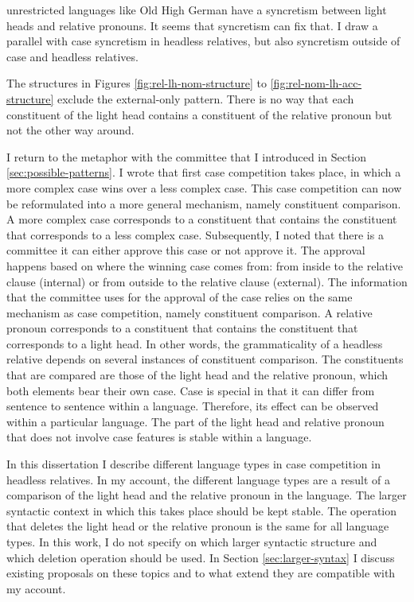 unrestricted languages like Old High German have a syncretism between light heads and relative pronouns. It seems that syncretism can fix that. I draw a parallel with case syncretism in headless relatives, but also syncretism outside of case and headless relatives.

The structures in Figures \ref{fig:rel-lh-nom-structure} to \ref{fig:rel-nom-lh-acc-structure} exclude the external-only pattern. There is no way that each constituent of the light head contains a constituent of the relative pronoun but not the other way around.

I return to the metaphor with the committee that I introduced in Section \ref{sec:possible-patterns}. I wrote that first case competition takes place, in which a more complex case wins over a less complex case. This case competition can now be reformulated into a more general mechanism, namely constituent comparison. A more complex case corresponds to a constituent that contains the constituent that corresponds to a less complex case.
Subsequently, I noted that there is a committee it can either approve this case or not approve it. The approval happens based on where the winning case comes from: from inside to the relative clause (internal) or from outside to the relative clause (external). The information that the committee uses for the approval of the case relies on the same mechanism as case competition, namely constituent comparison. A relative pronoun corresponds to a constituent that contains the constituent that corresponds to a light head.
In other words, the grammaticality of a headless relative depends on several instances of constituent comparison. The constituents that are compared are those of the light head and the relative pronoun, which both elements bear their own case. Case is special in that it can differ from sentence to sentence within a language. Therefore, its effect can be observed within a particular language. The part of the light head and relative pronoun that does not involve case features is stable within a language.

In this dissertation I describe different language types in case competition in headless relatives. In my account, the different language types are a result of a comparison of the light head and the relative pronoun in the language.
The larger syntactic context in which this takes place should be kept stable. The operation that deletes the light head or the relative pronoun is the same for all language types. In this work, I do not specify on which larger syntactic structure and which deletion operation should be used. In Section \ref{sec:larger-syntax} I discuss existing proposals on these topics and to what extend they are compatible with my account.

